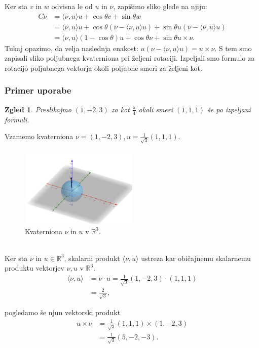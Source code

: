 \documentclass[a4paper,12pt]{article}
\def\R{\mathbb{R}} %
\newcommand{\dotpr}[2]{\langle #1, #2 \rangle}
\newtheorem{zgled}{Zgled}
\begin{document}
Ker sta $v$ in $w$ odvisna le od $u$ in $\nu$, zapišimo sliko glede na njiju:
\begin{align*}
   C\nu &= \dotpr{\nu}{u}u + \cos\theta v + \sin\theta w\\
        &= \dotpr{\nu}{u}u + \cos\theta (\nu - \dotpr{\nu}{u}u) + \sin\theta u(\nu - \dotpr{\nu}{u}u)\\
        &= \dotpr{\nu}{u}(1 - \cos\theta)u + \cos\theta \nu + \sin\theta u\times\nu.
\end{align*}
Tukaj opazimo, da velja naslednja enakost: $u(\nu - \dotpr{\nu}{u}u) = u\times\nu$. S tem smo zapisali sliko poljubnega kvaterniona pri željeni rotaciji.
Izpeljali smo formulo za rotacijo poljubnega vektorja okoli poljubne smeri za željeni kot.
\subsubsection{Primer uporabe}

\begin{zgled}
   Preslikajmo $(1, -2, 3)$ za kot $\frac{\pi}{4}$ okoli smeri $(1,1,1)$ še po izpeljani formuli.
\end{zgled}
Vzamemo kvaterniona $\nu = (1, -2, 3), u = \frac{1}{\sqrt{3}}(1,1,1)$.
\begin{figure}[ht]
   \centering
   \includegraphics[width = 0.5\textwidth]{vektorji_u_nu}
   \caption{Kvaterniona $\nu$ in $u$ v $\R^3$.}
\end{figure}\\
Ker sta $\nu$ in $u \in \R^3$, skalarni produkt $\dotpr{\nu}{u}$ ustreza kar običajnemu skalarnemu produktu vektorjev $\nu, u$ v $\R^3$.
\begin{align*}
   \dotpr{\nu}{u} &= \nu \cdot u = \frac{1}{\sqrt{3}} (1, -2, 3) \cdot (1,1,1)\\
                  &= \frac{2}{\sqrt{3}},
\end{align*}

\noindent pogledamo še njun vektorski produkt
\begin{align*}
   u \times \nu &= \frac{1}{\sqrt{3}}(1,1,1)\times(1,-2,3)\\
                &= \frac{1}{\sqrt{3}}(5,-2,-3).
\end{align*}
\end{document}
